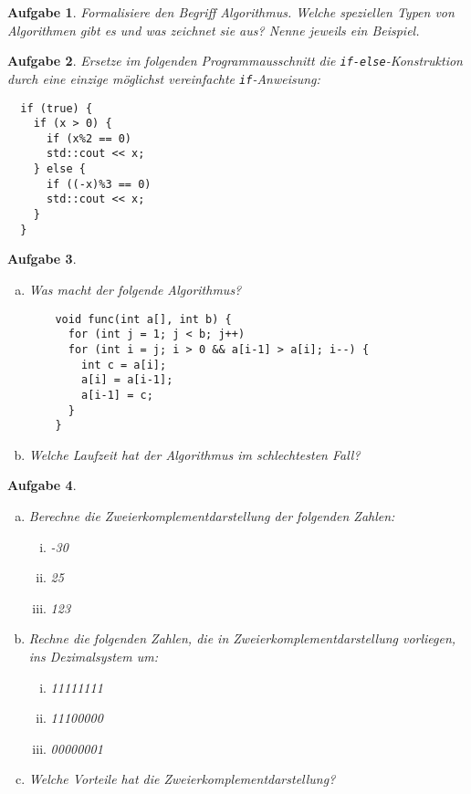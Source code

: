 \documentclass[a4paper,12pt,parskip=full]{scrartcl}
\theoremstyle{exercise}
\newtheorem{exercise}{Aufgabe}
\begin{document}
\begin{exercise}
Formalisiere den Begriff Algorithmus. Welche speziellen
Typen von Algorithmen gibt es und was zeichnet sie aus? Nenne jeweils
ein Beispiel.
\end{exercise}

\begin{exercise}
Ersetze im folgenden Programmausschnitt die
\lstinline{if-else}-Konstruktion durch eine einzige möglichst
vereinfachte \lstinline{if}-Anweisung:
\begin{lstlisting}
  if (true) {
    if (x > 0) {
      if (x%2 == 0)
      std::cout << x;
    } else {
      if ((-x)%3 == 0)
      std::cout << x;
    }
  }
\end{lstlisting}
\end{exercise}

\begin{exercise}
\begin{enumerate}[a)]
\item Was macht der folgende Algorithmus?
  \begin{lstlisting}
    void func(int a[], int b) {
      for (int j = 1; j < b; j++)
      for (int i = j; i > 0 && a[i-1] > a[i]; i--) {
        int c = a[i];
        a[i] = a[i-1];
        a[i-1] = c;
      }
    }
  \end{lstlisting}
\item Welche Laufzeit hat der Algorithmus im schlechtesten Fall?
\end{enumerate}
\end{exercise}

\begin{exercise}
\begin{enumerate}[a)]
\item Berechne die Zweierkomplementdarstellung der folgenden Zahlen:
  \begin{enumerate}[i)]
  \item -30
  \item 25
  \item 123
  \end{enumerate}

\item Rechne die folgenden Zahlen, die in Zweierkomplementdarstellung
  vorliegen, ins Dezimalsystem um:
  \begin{enumerate}[i)]
  \item 11111111
  \item 11100000
  \item 00000001
  \end{enumerate}

\item Welche Vorteile hat die Zweierkomplementdarstellung?
\end{enumerate}
\end{exercise}
\end{document}
